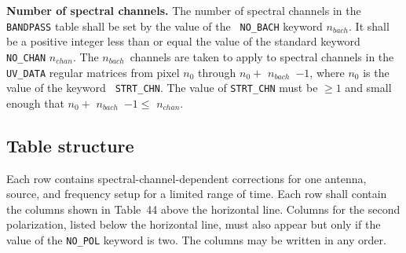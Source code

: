 \documentclass[twoside]{article}
\newcommand{\nchan}{$n_{chan}$}
\newcommand{\nbach}{$n_{bach}$}
\begin{document}
{\bf Number of spectral channels.}  The number of spectral channels in
the {\tt BANDPASS} table shall be set by the value of the {\tt
  NO\_BACH} keyword \nbach.  It shall be a positive integer less
than or equal the value of the standard keyword {\tt NO\_CHAN} \nchan.
The \nbach\ channels are taken to apply to spectral channels in the
{\tt UV\_DATA} regular matrices from pixel $n_0$ through $n_0 +$
\nbach\ $ - 1$, where $n_0$ is the value of the keyword {\tt
  STRT\_CHN}\@.  The value of {\tt STRT\_CHN} must be $\ge 1$ and
small enough that $n_0 +$ \nbach\ $ - 1 \le$ \nchan.

\subsection{Table structure}

Each row contains spectral-channel-dependent corrections for one
antenna, source, and frequency setup for a limited range of time.
Each row shall contain the columns shown in Table~44 above the
horizontal line.  Columns for the second polarization, listed below
the horizontal line, must also appear but only if the value of the
{\tt NO\_POL} keyword is two.  The columns may be written in any
order.
\end{document}
